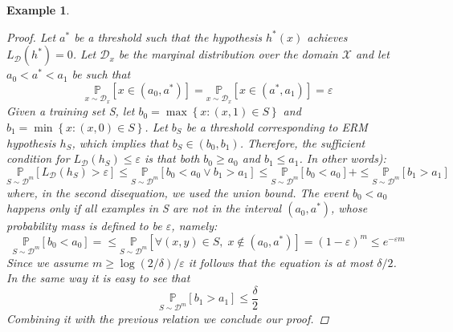 \documentclass[12pt]{report}
\theoremstyle{plain}
\newtheorem{example}{Example}[chapter]
\newcommand\mcl[1]{\mathcal{#1}}
\begin{document}
\begin{flushleft}
\begin{example}
	\begin{proof}
		Let $a^*$ be a threshold such that the hypothesis $h^*(x)$ achieves $L_\mcl{D}(h^*)=0$. Let $\mcl{D}_x$ be the marginal distribution over the domain $\mcl{X}$ and let $a_0 < a^* < a_1$ be such that
		\[ \underset{x\sim\mcl{D}_x}{\mathds{P}}\left[x\in(a_0,a^*)\right]= \underset{x\sim\mcl{D}_x}{\mathds{P}}\left[x\in(a^*,a_1)\right]=\varepsilon \]
		Given a training set S, let $b_0=\max\left\{x:(x,1)\in S\right\}$ and $b_1=\min\left\{x:(x,0)\in S\right\}$. Let $b_S$ be a threshold corresponding to ERM hypothesis $h_S$, which implies that $b_S\in(b_0,b_1)$. Therefore, the sufficient condition for $L_\mcl{D}(h_S)\leq\varepsilon$ is that both $b_0\geq a_0$ and $b_1\leq a_1$. In other words):
		\[ \underset{S\sim\mcl{D}^m}{\mathds{P}}\left[L_\mcl{D}(h_S)>\varepsilon\right]\leq \underset{S\sim\mcl{D}^m}{\mathds{P}}\left[b_0<a_0\vee b_1>a_1 \right] \leq\underset{S\sim\mcl{D}^m}{\mathds{P}}\left[b_0<a_0\right]+\leq\underset{S\sim\mcl{D}^m}{\mathds{P}}\left[b_1>a_1\right] \]
		where, in the second disequation, we used the union bound. 
		The event $b_0<a_0$ happens only if all examples in S are not in the interval $(a_0,a^*)$, whose probability mass is defined to be $\varepsilon$, namely:
		\[ \underset{S\sim\mcl{D}^m}{\mathds{P}}\left[b_0<a_0\right]=\leq\underset{S\sim\mcl{D}^m}{\mathds{P}}\left[\forall (x,y)\in S,\; x\notin(a_0,a^*)\right] = (1-\varepsilon)^m \leq e^{-\varepsilon m} \]
		Since we assume $m\geq \log(2/\delta)/\varepsilon$ it follows that the equation is at most $\delta/2$. In the same way it is easy to see that 
		\[ \underset{S\sim\mcl{D}^m}{\mathds{P}}\left[b_1>a_1\right]\leq \frac{\delta}{2} \]
		Combining it with the previous relation we conclude our proof.	
	\end{proof}
\end{example}
\vspace{0.5cm}


\end{flushleft}
\end{document}
